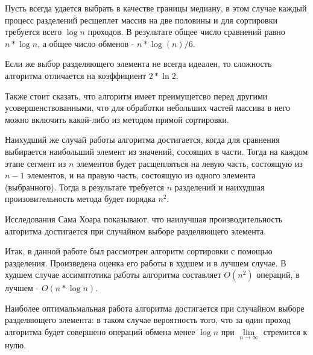 \documentclass[bachelor, och, labwork]{shiza}
\begin{document}
Пусть всегда удается выбрать в качестве границы медиану, в этом случае каждый 
процесс разделений ресщеплет массив на две половины и для сортировки требуется
всего $\log n$ проходов. В результате общее число сравнений равно $n*\log n$,
а общее число обменов - $n * \log (n)/6$.

Если же выбор разделяющего элемента не всегда идеален, то сложность алгоритма
отличается на коэффициент $2* \ln 2$.

Также стоит сказать, что алгоритм имеет преимущетсво перед другими
усовершенствованными, что для обработки небольших частей массива в него можно 
включить какой-либо из методом прямой сортировки.

Наихудший же случай работы алгоритма достигается, когда для сравнения выбирается
наибольший элемент из значений, сосоящих в части. Тогда на каждом этапе сегмент 
из $n$ элементов будет расщепляться на левую часть, состоящую из $n-1$ элементов,
и на правую часть, состоящую из одного элемента (выбранного). Тогда в результате
требуется $n$ разделений и наихудшая произовительность метода будет порядка 
$n^2$. 

Исследования Сама Хоара показывают, что наилучшая производительность алгоритма
достигается при случайном выборе разделяющего элемента.

\conclusion

Итак, в данной работе был рассмотрен алгоритм сортировки с помощью разделения.
Произведена оценка его работы в худшем и в лучшем случае. В худшем случае
ассимптотика работы алгоритма составляет $O(n^2)$ операций, 
в лучшем - $O(n*\log n)$.

Наиболее оптимальмальная работа алгоритма достигается при случайном выборе
разделяющего элемента: в таком случае вероятность того, что за один проход
алгоритма будет совершено операций обмена менее $\log n$ при 
$\lim\limits_{n\rightarrow\infty }$ стремится к нулю.
\end{document}
